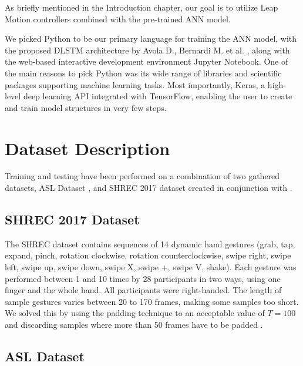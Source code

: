 As briefly mentioned in the Introduction chapter, our goal is to utilize Leap Motion controllers combined with the pre-trained ANN model. 

We picked Python to be our primary language for training the ANN model, with the proposed DLSTM architecture by Avola D., Bernardi M. et al. \cite{avola}, along with the web-based interactive development environment Jupyter Notebook. One of the main reasons to pick Python was its wide range of libraries and scientific packages supporting machine learning tasks. Most importantly, Keras, a high-level deep learning API integrated with TensorFlow, enabling the user to create and train model structures in very few steps.

\section{Dataset Description}

Training and testing have been performed on a combination of two gathered datasets, ASL Dataset \cite{avola}, and SHREC 2017 dataset created in conjunction with \cite{shrec}.

\subsection{SHREC 2017 Dataset}

The SHREC dataset contains sequences of 14 dynamic hand gestures (grab, tap, expand, pinch, rotation clockwise, rotation counterclockwise, swipe right, swipe left, swipe up, swipe down, swipe X, swipe +, swipe V, shake). Each gesture was performed between 1 and 10 times by 28 participants in two ways, using one finger and the whole hand. All participants were right-handed. The length of sample gestures varies between 20 to 170 frames, making some samples too short. We solved this by using the padding technique to an acceptable value of $T=100$ and discarding samples where more than 50 frames have to be padded \cite{shrec}.

\subsection{ASL Dataset}

